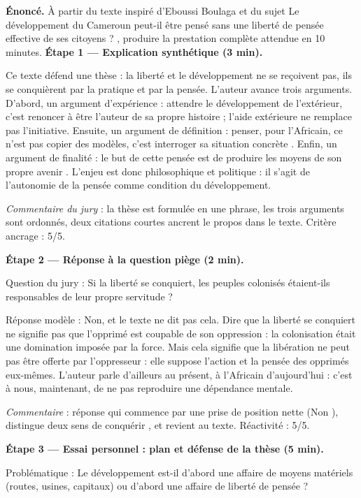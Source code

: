 \documentclass[11pt]{article}
\begin{document}
\begin{exoresolu}
\textbf{Énoncé.} À partir du texte inspiré d'Eboussi Boulaga et du sujet \og Le développement du Cameroun peut-il être pensé sans une liberté de pensée effective de ses citoyens ? \fg, produire la prestation complète attendue en 10 minutes.
\tcblower
\textbf{Étape 1 — Explication synthétique (3 min).}

\og Ce texte défend une thèse : la liberté et le développement ne se reçoivent pas, ils se conquièrent par la pratique et par la pensée. L'auteur avance trois arguments. D'abord, un argument d'expérience : attendre le développement de l'extérieur, c'est \og renoncer à être l'auteur de sa propre histoire \fg ; l'aide extérieure ne remplace pas l'initiative. Ensuite, un argument de définition : penser, pour l'Africain, ce n'est pas copier des modèles, c'est \og interroger sa situation concrète \fg. Enfin, un argument de finalité : le but de cette pensée est de \og produire les moyens de son propre avenir \fg. L'enjeu est donc philosophique et politique : il s'agit de l'autonomie de la pensée comme condition du développement. \fg

\emph{Commentaire du jury} : la thèse est formulée en une phrase, les trois arguments sont ordonnés, deux citations courtes ancrent le propos dans le texte. Critère \og ancrage \fg : 5/5.

\textbf{Étape 2 — Réponse à la question piège (2 min).}

Question du jury : \og Si la liberté se conquiert, les peuples colonisés étaient-ils responsables de leur propre servitude ? \fg

Réponse modèle : \og Non, et le texte ne dit pas cela. Dire que la liberté se conquiert ne signifie pas que l'opprimé est coupable de son oppression : la colonisation était une domination imposée par la force. Mais cela signifie que la libération ne peut pas être offerte par l'oppresseur : elle suppose l'action et la pensée des opprimés eux-mêmes. L'auteur parle d'ailleurs au présent, à l'Africain d'aujourd'hui : c'est à nous, maintenant, de ne pas reproduire une dépendance mentale. \fg

\emph{Commentaire} : réponse qui commence par une prise de position nette (\og Non \fg), distingue deux sens de \og conquérir \fg, et revient au texte. Réactivité : 5/5.

\textbf{Étape 3 — Essai personnel : plan et défense de la thèse (5 min).}

Problématique : \og Le développement est-il d'abord une affaire de moyens matériels (routes, usines, capitaux) ou d'abord une affaire de liberté de pensée ? \fg


\end{exoresolu}
\end{document}
